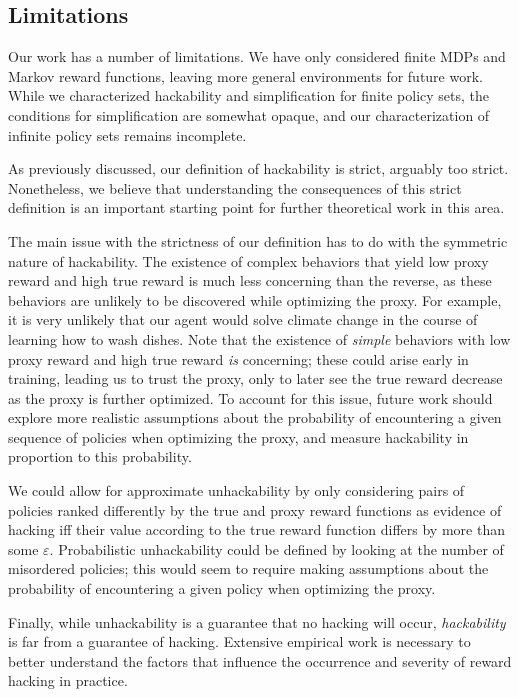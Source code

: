 \documentclass{article}
\theoremstyle{definition}
\theoremstyle{remark}
\begin{document}
\subsection{Limitations}
\label{sec:limitations}
Our work has a number of limitations.
We have only considered finite MDPs and Markov reward functions, leaving more general environments for future work.
While we characterized hackability and simplification for finite policy sets, the conditions for simplification are somewhat opaque, and our characterization of infinite policy sets remains incomplete.

As previously discussed, our definition of hackability is strict, arguably too strict.
Nonetheless, we believe that understanding the consequences of this strict definition is an important starting point for further theoretical work in this area. 

The main issue with the strictness of our definition has to do with the symmetric nature of hackability.  %
The existence of complex behaviors that yield low proxy reward and high true reward is much less concerning than the reverse, as these behaviors are unlikely to be discovered while optimizing the proxy.
For example, it is very unlikely that our agent would solve climate change in the course of learning how to wash dishes.
Note that the existence of \textit{simple} behaviors with low proxy reward and high true reward \textit{is} concerning; 
these could arise early in training, leading us to trust the proxy, only to later see the true reward decrease as the proxy is further optimized.
To account for this issue, future work should explore more  realistic assumptions about the probability of encountering a given sequence of policies when optimizing the proxy, and measure hackability in proportion to this probability.


We could allow for approximate unhackability by only considering pairs of policies ranked differently by the true and proxy reward functions as evidence of hacking iff their value according to the true reward function differs by more than some $\varepsilon$.
Probabilistic unhackability could be defined by looking at the number of misordered policies; this would seem to require making assumptions about the probability of encountering a given policy when optimizing the proxy.






Finally, while unhackability is a guarantee that no hacking will occur, \textit{hackability} is far from a guarantee of hacking.
Extensive empirical work is necessary to better understand the factors that influence the occurrence and severity of reward hacking in practice.
\end{document}
